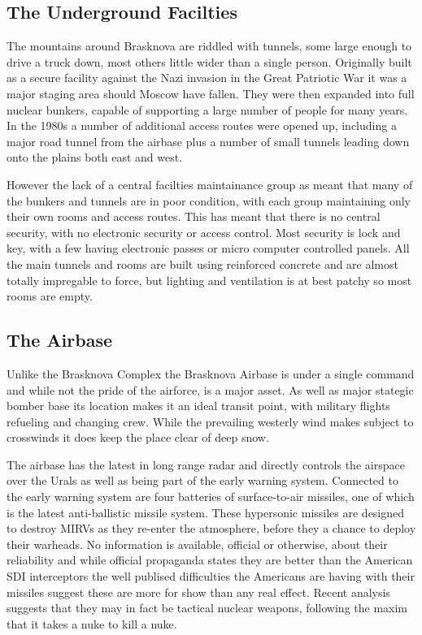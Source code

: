 \documentclass{amsart}
\begin{document}
\begin{multicols}{3}
\subsection{The Underground Facilties}

The mountains around Brasknova are riddled with tunnels, some large
enough to drive a truck down, most others little wider than a single
person.  Originally built as a secure facility against the Nazi
invasion in the Great Patriotic War it was a major staging area should
Moscow have fallen.  They were then expanded into full nuclear
bunkers, capable of supporting a large number of people for many
years.  In the 1980s a number of additional access routes were opened
up, including a major road tunnel from the airbase plus a number of
small tunnels leading down onto the plains both east and west.

However the lack of a central facilties maintainance group as meant
that many of the bunkers and tunnels are in poor condition, with each
group maintaining only their own rooms and access routes.  This has
meant that there is no central security, with no electronic security
or access control.  Most security is lock and key, with a few having
electronic passes or micro computer controlled panels.  All the main
tunnels and rooms are built using reinforced concrete and are almost
totally impregable to force, but lighting and ventilation is at best
patchy so most rooms are empty.

\subsection{The Airbase}

Unlike the Brasknova Complex the Brasknova Airbase is under a single
command and while not the pride of the airforce, is a major asset.  As
well as major stategic bomber base its location makes it an ideal
transit point, with military flights refueling and changing crew.
While the prevailing westerly wind makes subject to crosswinds it does
keep the place clear of deep snow.

The airbase has the latest in long range radar and directly controls
the airspace over the Urals as well as being part of the early warning
system.  Connected to the early warning system are four batteries of
surface-to-air missiles, one of which is the latest anti-ballistic
missile system.  These hypersonic missiles are designed to destroy
MIRVs as they re-enter the atmosphere, before they a chance to deploy
their warheads.  No information is available, official or otherwise,
about their reliability and while official propaganda states they are
better than the American SDI interceptors the well publised
difficulties the Americans are having with their missiles suggest
these are more for show than any real effect.  Recent analysis
suggests that they may in fact be tactical nuclear weapons, following
the maxim that it takes a nuke to kill a nuke.


\end{multicols}
\end{document}
